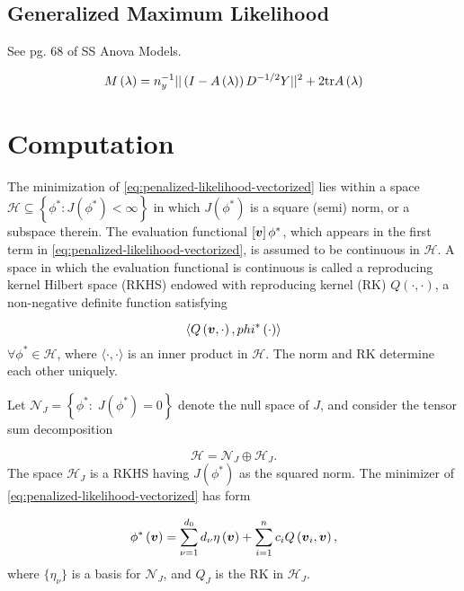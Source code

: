 \documentclass[12pt]{article}
\newcommand{\Hilbert}{\mathcal{H}}
\newcommand{\bfv}{\mbox{\boldmath $v$}}
\theoremstyle{definition}
\begin{document}
\subsection{Generalized Maximum Likelihood}

See pg. 68 of SS Anova Models.

\[
M\left(\lambda\right) = n_y^{-1} \vert \vert \left( I - A\left(\lambda\right)\right)D^{-1/2} Y\vert \vert^2 + 2\textup{tr}A\left(\lambda\right)
\]



\section{Computation}

The minimization of \ref{eq:penalized-likelihood-vectorized} lies within a space $\Hilbert \subseteq \left \{ \phi^*: J\left(\phi^*\right) < \infty \right\}$ in which $J\left(\phi^*\right)$ is a square (semi) norm, or a subspace therein. The evaluation functional $\left[ \bfv \right] \phi^*$, which appears in the first term in \ref{eq:penalized-likelihood-vectorized}, is assumed to be continuous in $\Hilbert$. A space in which the evaluation functional is continuous is called a reproducing kernel Hilbert space (RKHS) endowed with reproducing kernel (RK) $Q\left(\cdot, \cdot\right)$, a non-negative definite function satisfying 

\[
\langle Q\left(\bfv,\cdot\right), phi^*\left(\cdot\right) \rangle
\]
\bigskip
\noindent
$\forall \phi^* \in \Hilbert$, where $\langle \cdot, \cdot \rangle$ is an inner product in $\Hilbert$. The norm and RK determine each other uniquely.

Let $\mathcal{N}_J = \left\{ \phi^*:\; J\left(\phi^*\right) = 0\right\}$ denote the null space of $J$, and consider the tensor sum decomposition

\[
\Hilbert = \mathcal{N}_J \oplus \Hilbert_J.
\]
\noindent
The space $\Hilbert_J$ is a RKHS having $J\left(\phi^*\right)$ as the squared norm. The minimizer of \ref{eq:penalized-likelihood-vectorized} has form 

\begin{equation} \label{eq:RKHS-functional-form}
\phi^*\left(\bfv\right) = \sum_{\nu = 1}^{d_0} d_\nu \eta\left( \bfv \right) + \sum_{i=1}^n c_i Q\left(\bfv_i, \bfv \right),
\end{equation} 
\bigskip
\noindent
where $\lbrace \eta_\nu \rbrace$ is a basis for $\mathcal{N}_J$, and $Q_J$ is the RK in $\Hilbert_J$. 
\end{document}
